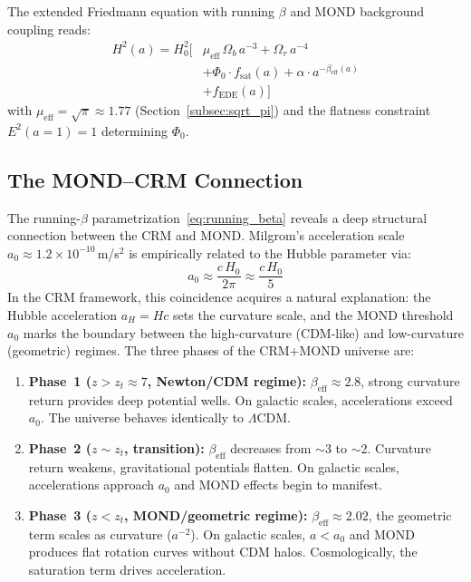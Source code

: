 \documentclass[aps,prd,twocolumn,superscriptaddress,nofootinbib,floatfix]{revtex4-2}
\begin{document}
The extended Friedmann equation with running $\beta$ and MOND background coupling reads:
\begin{equation}
\begin{split}
H^2(a) = H_0^2 \Big[&\mu_{\mathrm{eff}}\,\Omega_b\,a^{-3} + \Omega_r\,a^{-4} \\
&+ \Phi_0 \cdot f_{\mathrm{sat}}(a) + \alpha \cdot a^{-\beta_{\mathrm{eff}}(a)} \\
&+ f_{\mathrm{EDE}}(a)\Big]
\end{split}
\label{eq:running_friedmann}
\end{equation}
with $\mu_{\mathrm{eff}} = \sqrt{\pi} \approx 1.77$ (Section~\ref{subsec:sqrt_pi}) and the flatness constraint $E^2(a{=}1) = 1$ determining $\Phi_0$.


\subsection{The MOND--CRM Connection}
\label{subsec:mond_cfm_connection}

The running-$\beta$ parametrization~\eqref{eq:running_beta} reveals a deep structural connection between the CRM and MOND. Milgrom's acceleration scale $a_0 \approx 1.2 \times 10^{-10}$\,m/s$^2$ is empirically related to the Hubble parameter via:
\begin{equation}
a_0 \approx \frac{c\,H_0}{2\pi} \approx \frac{c\,H_0}{5}
\end{equation}
In the CRM framework, this coincidence acquires a natural explanation: the Hubble acceleration $a_H = Hc$ sets the curvature scale, and the MOND threshold $a_0$ marks the boundary between the high-curvature (CDM-like) and low-curvature (geometric) regimes. The three phases of the CRM+MOND universe are:

\begin{enumerate}
\item \textbf{Phase~1 ($z > z_t \approx 7$, Newton/CDM regime):} $\beta_{\mathrm{eff}} \approx 2.8$, strong curvature return provides deep potential wells. On galactic scales, accelerations exceed $a_0$. The universe behaves identically to $\Lambda$CDM.

\item \textbf{Phase~2 ($z \sim z_t$, transition):} $\beta_{\mathrm{eff}}$ decreases from $\sim$3 to $\sim$2. Curvature return weakens, gravitational potentials flatten. On galactic scales, accelerations approach $a_0$ and MOND effects begin to manifest.

\item \textbf{Phase~3 ($z < z_t$, MOND/geometric regime):} $\beta_{\mathrm{eff}} \approx 2.02$, the geometric term scales as curvature ($a^{-2}$). On galactic scales, $a < a_0$ and MOND produces flat rotation curves without CDM halos. Cosmologically, the saturation term drives acceleration.
\end{enumerate}
\end{document}
